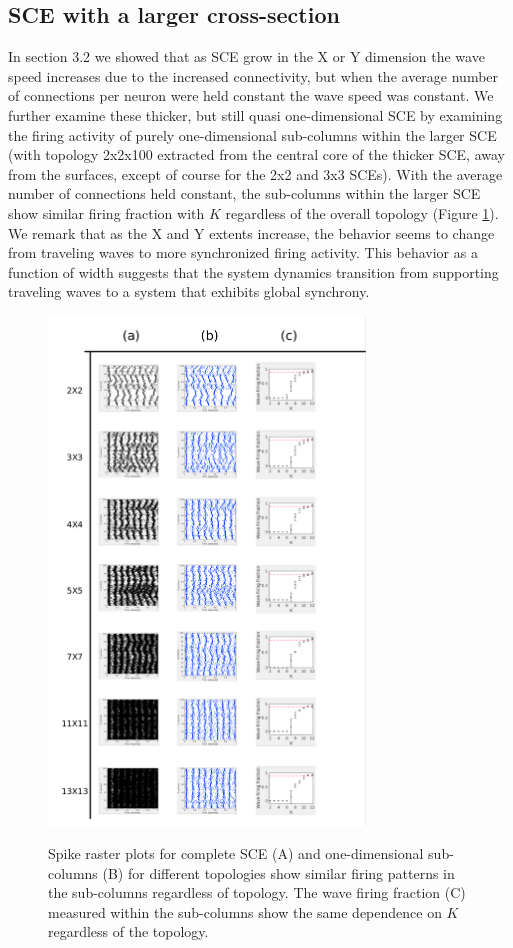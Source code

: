 \documentclass[12pt]{article}
\begin{document}
\clearpage
\subsection*{SCE with a larger cross-section}
In section 3.2 we showed that as SCE grow in the X or Y dimension the wave speed increases due to the increased connectivity, but when the average number of connections per neuron were held constant the wave speed was constant.
We further examine these thicker, but still quasi one-dimensional SCE by examining the firing activity of purely one-dimensional sub-columns within the larger SCE (with topology 2x2x100 extracted from the central core of the thicker SCE, away from the surfaces, except of course for the 2x2 and 3x3 SCEs).
With the average number of connections held constant, the sub-columns within the larger SCE show similar firing fraction with $K$ regardless of the overall topology (Figure \ref{fig:LargeSCESubcolumns}).
We remark that as the X and Y extents increase, the behavior seems to change from traveling waves to more synchronized firing activity.
This behavior as a function of width suggests that the system dynamics transition from supporting traveling waves to a system that exhibits global synchrony.
\begin{figure}[!htb]
 \caption{ Spike raster plots for complete SCE (A) and one-dimensional sub-columns (B) for different topologies show similar firing patterns in the sub-columns regardless  of topology. 
           The wave firing fraction (C) measured within the sub-columns show the same dependence on $K$ regardless of the topology.}
   \includegraphics[width=0.75\textwidth]{fig/WaveFractionVsThick}
   \label{fig:LargeSCESubcolumns}
\end{figure}
\FloatBarrier
\end{document}
